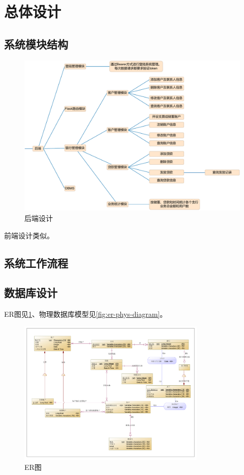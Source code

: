 \documentclass{ctexart}
\begin{document}
\section{总体设计}

\subsection{系统模块结构}

\begin{figure}[H]
    \centering
    \includegraphics[width=\textwidth]{assets/diagram.drawio.pdf}
    \caption{后端设计}
\end{figure}

前端设计类似。

\subsection{系统工作流程}

\subsection{数据库设计}

ER图见\ref{fig:er-diagram}、物理数据库模型见\ref{fig:er-phys-diagram}。

\begin{figure}[H]
    \centering
    \includegraphics[width=0.8\textwidth]{assets/er-diagram.pdf}
    \caption{ER图}
    \label{fig:er-diagram}
\end{figure}
\end{document}
